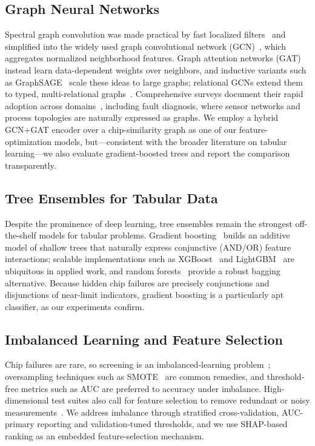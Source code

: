 \documentclass[electronics,article,submit,pdftex,moreauthors]{Definitions/mdpi}
\begin{document}
\subsection{Graph Neural Networks}
Spectral graph convolution was made practical by fast localized filters~\cite{defferrard2016chebnet} and simplified into the widely used graph convolutional network (GCN)~\cite{kipf2017semi}, which aggregates normalized neighborhood features. Graph attention networks (GAT)~\cite{velickovic2018graph} instead learn data-dependent weights over neighbors, and inductive variants such as GraphSAGE~\cite{hamilton2017inductive} scale these ideas to large graphs; relational GCNs extend them to typed, multi-relational graphs~\cite{schlichtkrull2018rgcn}. Comprehensive surveys document their rapid adoption across domains~\cite{wu2021comprehensive}, including fault diagnosis, where sensor networks and process topologies are naturally expressed as graphs. We employ a hybrid GCN+GAT encoder over a chip-similarity graph as one of our feature-optimization models, but---consistent with the broader literature on tabular learning---we also evaluate gradient-boosted trees and report the comparison transparently.

\subsection{Tree Ensembles for Tabular Data}
Despite the prominence of deep learning, tree ensembles remain the strongest off-the-shelf models for tabular problems. Gradient boosting~\cite{friedman2001greedy} builds an additive model of shallow trees that naturally express conjunctive (AND/OR) feature interactions; scalable implementations such as XGBoost~\cite{chen2016xgboost} and LightGBM~\cite{ke2017lightgbm} are ubiquitous in applied work, and random forests~\cite{breiman2001random} provide a robust bagging alternative. Because hidden chip failures are precisely conjunctions and disjunctions of near-limit indicators, gradient boosting is a particularly apt classifier, as our experiments confirm.

\subsection{Imbalanced Learning and Feature Selection}
Chip failures are rare, so screening is an imbalanced-learning problem~\cite{he2009imbalance}; oversampling techniques such as SMOTE~\cite{chawla2002smote} are common remedies, and threshold-free metrics such as AUC are preferred to accuracy under imbalance. High-dimensional test suites also call for feature selection to remove redundant or noisy measurements~\cite{guyon2003feature}. We address imbalance through stratified cross-validation, AUC-primary reporting and validation-tuned thresholds, and we use SHAP-based ranking as an embedded feature-selection mechanism.
\end{document}
